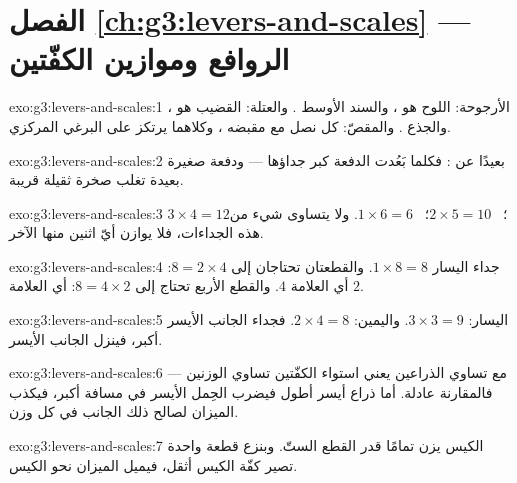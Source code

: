 \section*{الفصل \ref{ch:g3:levers-and-scales} --- الروافع وموازين الكفّتين}

\begin{solution}{exo:g3:levers-and-scales:1}
الأرجوحة: اللوح هو ، والسند الأوسط .
والعتلة: القضيب هو ، والجذع . والمقصّ: كل
نصل مع مقبضه ، وكلاهما يرتكز على البرغي المركزي.
\end{solution}

\begin{solution}{exo:g3:levers-and-scales:2}
بعيدًا عن : فكلما بَعُدت الدفعة كبر جداؤها ---
ودفعة صغيرة بعيدة تغلب صخرة ثقيلة قريبة.
\end{solution}

\begin{solution}{exo:g3:levers-and-scales:3}
$3 \times 4 = 12$؛ \ $2 \times 5 = 10$؛ \ $1 \times 6 = 6$. ولا
يتساوى شيء من هذه الجداءات، فلا يوازن أيّ اثنين منها الآخر.
\end{solution}

\begin{solution}{exo:g3:levers-and-scales:4}
جداء اليسار $1 \times 8 = 8$. والقطعتان تحتاجان إلى
$8 = 2 \times 4$: أي العلامة $4$. والقطع الأربع تحتاج إلى
$8 = 4 \times 2$: أي العلامة $2$.
\end{solution}

\begin{solution}{exo:g3:levers-and-scales:5}
اليسار: $3 \times 3 = 9$. واليمين: $2 \times 4 = 8$. فجداء
الجانب الأيسر أكبر، فينزل الجانب الأيسر.
\end{solution}

\begin{solution}{exo:g3:levers-and-scales:6}
مع تساوي الذراعين يعني استواء الكفّتين تساوي الوزنين ---
فالمقارنة عادلة. أما ذراع أيسر أطول فيضرب الحِمل الأيسر في مسافة
أكبر، فيكذب الميزان لصالح ذلك الجانب في كل وزن.
\end{solution}

\begin{solution}{exo:g3:levers-and-scales:7}
الكيس يزن تمامًا قدر القطع الستّ. وبنزع قطعة واحدة تصير كفّة
الكيس أثقل، فيميل الميزان نحو الكيس.
\end{solution}

